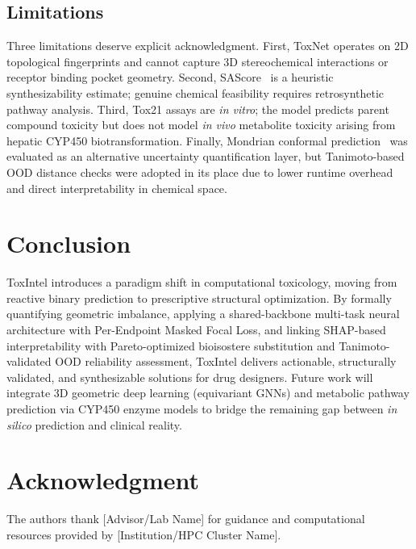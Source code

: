 \documentclass[lettersize,journal]{IEEEtran}
\begin{document}
  \subsection{Limitations}
  Three limitations deserve explicit acknowledgment.
  First, ToxNet operates on 2D topological fingerprints and cannot capture
  3D stereochemical interactions or receptor binding pocket geometry.
  Second, SAScore~\cite{ertl2009sascore} is a heuristic synthesizability estimate;
  genuine chemical feasibility requires retrosynthetic pathway analysis.
  Third, Tox21 assays are \textit{in vitro}; the model predicts parent
  compound toxicity but does not model \textit{in vivo} metabolite toxicity
  arising from hepatic CYP450 biotransformation.
  Finally, Mondrian conformal prediction~\cite{vovk2005} was evaluated as an
  alternative uncertainty quantification layer, but Tanimoto-based OOD distance
  checks were adopted in its place due to lower runtime overhead and direct
  interpretability in chemical space.

  \section{Conclusion}
  ToxIntel introduces a paradigm shift in computational toxicology, moving
  from reactive binary prediction to prescriptive structural optimization.
  By formally quantifying geometric imbalance, applying a shared-backbone
  multi-task neural architecture with Per-Endpoint Masked Focal Loss, and
  linking SHAP-based interpretability with Pareto-optimized bioisostere
  substitution and Tanimoto-validated OOD reliability assessment, ToxIntel delivers
  actionable, structurally validated, and synthesizable solutions for drug
  designers.
  Future work will integrate 3D geometric deep learning (equivariant GNNs)
  and metabolic pathway prediction via CYP450 enzyme models to bridge the
  remaining gap between \textit{in silico} prediction and clinical reality.

  \section*{Acknowledgment}
  The authors thank [Advisor/Lab Name] for guidance and computational resources
  provided by [Institution/HPC Cluster Name].
\end{document}

